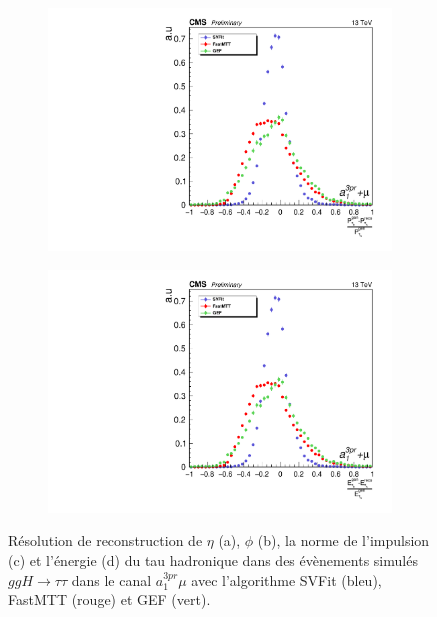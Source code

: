 \begin{figure}[!ht]
  \begin{subfigure}[b]{0.5\linewidth}
    \centering
    \includegraphics[width=\linewidth]{Chapitre6/Images/P.pdf} 
    \caption{} 
  \end{subfigure}%
  \begin{subfigure}[b]{0.5\linewidth}
    \centering
    \includegraphics[width=\linewidth]{Chapitre6/Images/E.pdf} 
    \caption{} 
  \end{subfigure} 
  \caption{Résolution de reconstruction de $\eta$ (a), $\phi$ (b), la norme de l'impulsion (c) et l'énergie (d) du tau hadronique dans des évènements simulés $ggH\rightarrow\tau\tau$ dans le canal $a_1^{3pr}\mu$ avec l'algorithme SVFit (bleu), FastMTT (rouge) et GEF (vert).}
  \label{TauRes}
\end{figure}

